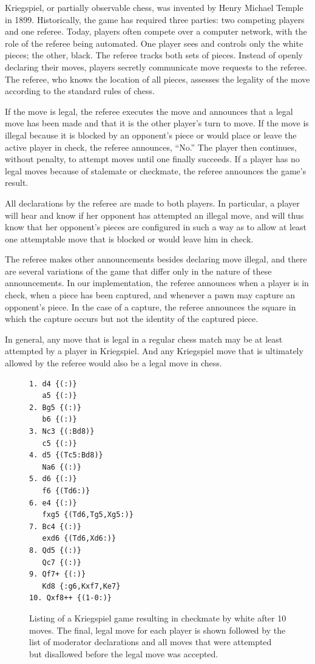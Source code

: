 \documentclass[10pt, conference, compsocconf]{IEEEtran}
\begin{document}
Kriegspiel, or partially observable chess,  was invented by Henry Michael
Temple in 1899.  Historically, the game has required three parties: two
competing players and one referee.  Today, players often compete over a
computer network, with the role of the referee being automated.  One player
sees and controls only the white pieces; the other, black.  The referee tracks
both sets of pieces.  Instead of openly declaring their moves, players secretly
communicate move requests to the referee.  The referee, who knows the location
of all pieces, assesses the legality of the move according to the standard
rules of chess.  

If the move is legal, the referee executes the move and announces that a
legal move has been made and that it is the other player's turn to move.  If
the move is illegal because it is blocked by an opponent's piece or would place
or leave the active player in check, the referee announces, ``No.''  The player
then continues, without penalty, to attempt moves until one finally succeeds.
If a player has no legal moves because of stalemate or checkmate, the referee
announces the game's result.

All declarations by the referee are made to both players.  In
particular, a player will hear and know if her opponent has attempted an
illegal move, and will thus know that her opponent's pieces are configured in
such a way as to allow at least one attemptable move that is blocked or would
leave him in check.  

The referee makes other announcements besides declaring move illegal, and there
are several variations of the game that differ only in the nature of these
announcements.  In our implementation, the referee announces when a player is
in check, when a piece has been captured, and whenever a pawn may capture an
opponent's piece.  In the case of a capture, the referee announces the square
in which the capture occurs but not the identity of the captured piece.

In general, any move that is legal in a regular chess match may be at least
attempted by a player in Kriegspiel.  And any Kriegspiel move that is
ultimately allowed by the referee would also be a legal move in chess.    

\begin{figure}
\begin{center}
\begin{verbatim}
1. d4 {(:)}
   a5 {(:)}
2. Bg5 {(:)}
   b6 {(:)}
3. Nc3 {(:Bd8)}
   c5 {(:)}
4. d5 {(Tc5:Bd8)}
   Na6 {(:)}
5. d6 {(:)}
   f6 {(Td6:)}
6. e4 {(:)}
   fxg5 {(Td6,Tg5,Xg5:)}
7. Bc4 {(:)}
   exd6 {(Td6,Xd6:)}
8. Qd5 {(:)}
   Qc7 {(:)}
9. Qf7+ {(:)} 
   Kd8 {:g6,Kxf7,Ke7}
10. Qxf8++ {(1-0:)}
\end{verbatim}
\end{center}
\caption{Listing of a Kriegspiel game resulting in checkmate by white after 10 moves. The final, legal move for each player is shown followed by the list of moderator declarations and all moves that were attempted but disallowed before the legal move was accepted.}
\label{listing}
\vspace{-0.1in}
\end{figure}
\end{document}
